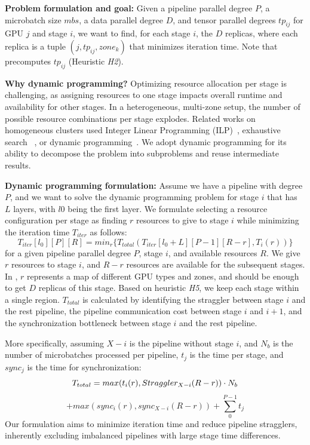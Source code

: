 \textbf{Problem formulation and goal:} Given a pipeline parallel degree $P$, a microbatch size $mbs$, a data parallel degree $D$, and tensor parallel degrees $tp_{ij}$ for GPU $j$ and stage $i$, we want to find, for each stage $i$,  the $D$ replicas, where each replica is a tuple $(j, tp_{ij}, zone_k)$ that minimizes iteration time. Note that \sailor precomputes $tp_{ij}$ (Heuristic \textit{H2}). 

\textbf{Why dynamic programming?} Optimizing resource allocation per stage is challenging, as assigning resources to one stage impacts overall runtime and availability for other stages. In a heterogeneous, multi-zone setup, the number of possible resource combinations per stage explodes. Related works on homogeneous clusters used  Integer Linear Programming (ILP)~\cite{zheng2022alpa, Jang2023Oobleck}, exhaustive search ~\cite{Athlur22Varuna}, or dynamic programming~\cite{li2022amp, Tarnawski21Piper}. We adopt dynamic programming for its ability to decompose the problem into subproblems and reuse intermediate results.

\textbf{Dynamic programming formulation:} Assume we have a pipeline with degree $P$, and we want to solve the dynamic programming problem for stage $i$ that has $L$ layers, with $l0$ being the first layer. We formulate selecting a resource configuration per stage as finding $r$ resources to give to stage $i$ while minimizing the iteration time $T_{iter}$ as follows: \begin{equation}\label{eq:dp}
T_{iter}[l_0][P][R] = min_r\{T_{total}(T_{iter}[l_0+L][P-1][R-r], T_i(r))\}
\end{equation}
for a given pipeline parallel degree $P$, stage $i$, and available resources $R$. 
We give $r$ resources to stage $i$, and $R-r$ resources are available for the subsequent stages. In \sailor, $r$ represents a map of different GPU types and zones, and should be enough to get $D$ replicas of this stage. Based on heuristic \textit{H5}, we keep each stage within a single region. $T_{total}$ is calculated by identifying the straggler between stage $i$ and the rest pipeline, the pipeline communication cost between stage $i$ and $i+1$, and the synchronization bottleneck between stage $i$ and the rest pipeline.

More specifically, assuming $X-i$ is the pipeline without stage $i$, and $N_b$ is the number of microbatches processed per pipeline, $t_j$ is the time per stage, and $sync_j$ is the time for synchronization:
$$
T_{total} = max(t_i(r), Straggler_{X-i}(R-r)) \cdot N_b \newline
$$
$$
+ max(sync_i(r), sync_{X-i}(R-r)) + \sum_0^{P-1} t_j 
$$
Our formulation aims to minimize iteration time and reduce pipeline stragglers, inherently excluding imbalanced pipelines with large stage time differences.


